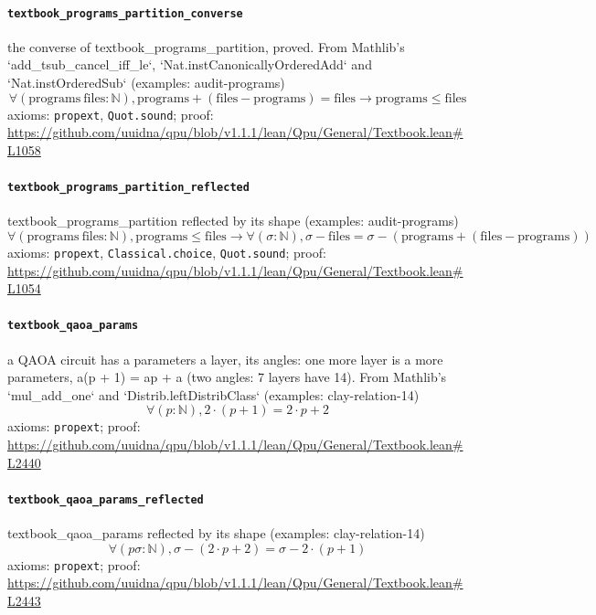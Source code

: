 \documentclass[11pt]{article}
\begin{document}
\paragraph{\texttt{textbook\_programs\_partition\_converse}}
the converse of textbook\_programs\_partition, proved. From Mathlib's `add\_tsub\_cancel\_iff\_le`, `Nat.instCanonicallyOrderedAdd` and `Nat.instOrderedSub` (examples: audit-programs)
\[ \forall (\mathrm{programs}\ \mathrm{files} : \mathbb{N}), \mathrm{programs} + (\mathrm{files} - \mathrm{programs}) = \mathrm{files} \to \mathrm{programs} \le \mathrm{files} \]
\noindent axioms: \texttt{propext}, \texttt{Quot.sound}; proof: \url{https://github.com/uuidna/qpu/blob/v1.1.1/lean/Qpu/General/Textbook.lean\#L1058}

\paragraph{\texttt{textbook\_programs\_partition\_reflected}}
textbook\_programs\_partition reflected by its shape (examples: audit-programs)
\[ \forall (\mathrm{programs}\ \mathrm{files} : \mathbb{N}), \mathrm{programs} \le \mathrm{files} \to \forall (\sigma : \mathbb{N}), \sigma - \mathrm{files} = \sigma - (\mathrm{programs} + (\mathrm{files} - \mathrm{programs})) \]
\noindent axioms: \texttt{propext}, \texttt{Classical.choice}, \texttt{Quot.sound}; proof: \url{https://github.com/uuidna/qpu/blob/v1.1.1/lean/Qpu/General/Textbook.lean\#L1054}

\paragraph{\texttt{textbook\_qaoa\_params}}
a QAOA circuit has a parameters a layer, its angles: one more layer is a more parameters, a(p + 1) = ap + a (two angles: 7 layers have 14). From Mathlib's `mul\_add\_one` and `Distrib.leftDistribClass` (examples: clay-relation-14)
\[ \forall (p : \mathbb{N}), 2 \cdot (p + 1) = 2 \cdot p + 2 \]
\noindent axioms: \texttt{propext}; proof: \url{https://github.com/uuidna/qpu/blob/v1.1.1/lean/Qpu/General/Textbook.lean\#L2440}

\paragraph{\texttt{textbook\_qaoa\_params\_reflected}}
textbook\_qaoa\_params reflected by its shape (examples: clay-relation-14)
\[ \forall (p \sigma : \mathbb{N}), \sigma - (2 \cdot p + 2) = \sigma - 2 \cdot (p + 1) \]
\noindent axioms: \texttt{propext}; proof: \url{https://github.com/uuidna/qpu/blob/v1.1.1/lean/Qpu/General/Textbook.lean\#L2443}
\end{document}
